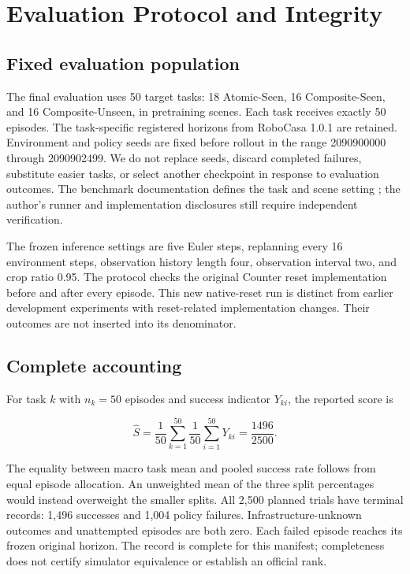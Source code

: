 \documentclass[10pt,twocolumn,letterpaper]{article}
\begin{document}
\section{Evaluation Protocol and Integrity}

\subsection{Fixed evaluation population}

The final evaluation uses 50 target tasks: 18 Atomic-Seen, 16 Composite-Seen, and 16 Composite-Unseen, in pretraining scenes. Each task receives exactly 50 episodes. The task-specific registered horizons from RoboCasa 1.0.1 are retained. Environment and policy seeds are fixed before rollout in the range 2090900000 through 2090902499. We do not replace seeds, discard completed failures, substitute easier tasks, or select another checkpoint in response to evaluation outcomes. The benchmark documentation defines the task and scene setting \cite{r3}; the author's runner and implementation disclosures still require independent verification.


The frozen inference settings are five Euler steps, replanning every 16 environment steps, observation history length four, observation interval two, and crop ratio 0.95. The protocol checks the original Counter reset implementation before and after every episode. This new native-reset run is distinct from earlier development experiments with reset-related implementation changes. Their outcomes are not inserted into its denominator.


\subsection{Complete accounting}

For task $k$ with $n_k=50$ episodes and success indicator $Y_{ki}$, the reported score is


\begin{equation}\widehat S=\frac1{50}\sum_{k=1}^{50}\frac1{50}\sum_{i=1}^{50}Y_{ki}=\frac{1496}{2500}.\end{equation}

The equality between macro task mean and pooled success rate follows from equal episode allocation. An unweighted mean of the three split percentages would instead overweight the smaller splits. All 2,500 planned trials have terminal records: 1,496 successes and 1,004 policy failures. Infrastructure-unknown outcomes and unattempted episodes are both zero. Each failed episode reaches its frozen original horizon. The record is complete for this manifest; completeness does not certify simulator equivalence or establish an official rank.
\end{document}
